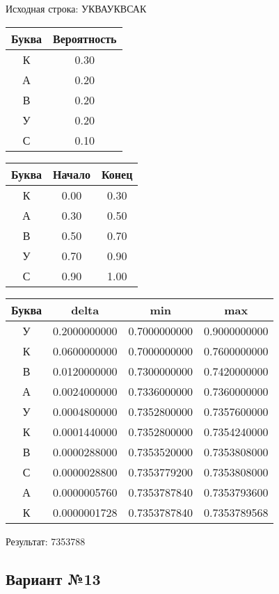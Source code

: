 \documentclass[a4paper, 12pt]{article}
\begin{document}
Исходная строка: УКВАУКВСАК\
\begin{center}
 \begin{tabular}{ |c|c| } 
  \hline
     Буква & Вероятность \\ \hline
К & 0.30\\\hline
А & 0.20\\\hline
В & 0.20\\\hline
У & 0.20\\\hline
С & 0.10
\\ \hline \end{tabular}
\end{center}
\begin{center}
 \begin{tabular}{ |c|c|c| } 
  \hline
     Буква & Начало & Конец \\ \hline
К & 0.00 & 0.30\\\hline
А & 0.30 & 0.50\\\hline
В & 0.50 & 0.70\\\hline
У & 0.70 & 0.90\\\hline
С & 0.90 & 1.00
\\ \hline \end{tabular}
\end{center}
\begin{center}
 \begin{tabular}{ |c|c|c|c| } 
  \hline
     Буква & delta & min & max \\ \hline
У & 0.2000000000 & 0.7000000000 & 0.9000000000\\\hline
К & 0.0600000000 & 0.7000000000 & 0.7600000000\\\hline
В & 0.0120000000 & 0.7300000000 & 0.7420000000\\\hline
А & 0.0024000000 & 0.7336000000 & 0.7360000000\\\hline
У & 0.0004800000 & 0.7352800000 & 0.7357600000\\\hline
К & 0.0001440000 & 0.7352800000 & 0.7354240000\\\hline
В & 0.0000288000 & 0.7353520000 & 0.7353808000\\\hline
С & 0.0000028800 & 0.7353779200 & 0.7353808000\\\hline
А & 0.0000005760 & 0.7353787840 & 0.7353793600\\\hline
К & 0.0000001728 & 0.7353787840 & 0.7353789568
\\ \hline \end{tabular}
\end{center}
Результат: 7353788
\pagebreak
\subsection{Вариант №13}
\end{document}
